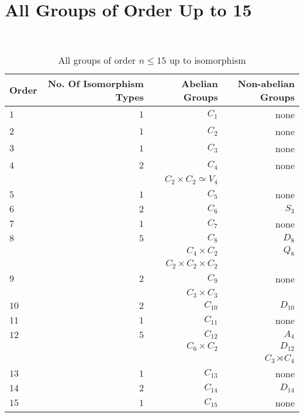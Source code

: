 \section{All Groups of Order Up to 15}

\begin{center}
  \begin{table}[H]~\label{tbl:all-groups}
    \begin{tabular}{ l | r | r | r }
      Order & No. Of Isomorphism Types & Abelian Groups & Non-abelian Groups \\
      \midrule
      $1$ & $1$ & $C_1$ & none \\
      \midrule
      $2$ & $1$ & $C_2$ & none \\
      \midrule
      $3$ & $1$ & $C_3$ & none \\
      \midrule
      $4$ & $2$ & $C_4$ & none \\
          &     & $C_2 \times C_2 \simeq V_4$ & \\
      \midrule
      $5$ & $1$ & $C_5$ & none \\
      \midrule
      $6$ & $2$ & $C_6$ & $S_3$ \\
      \midrule
      $7$ & $1$ & $C_7$ & none \\
      \midrule
      $8$ & $5$ & $C_8$ & $D_8$ \\
          &     & $C_4 \times C_2$ & $Q_8$ \\
          &     & $C_2 \times C_2 \times C_2$ &    \\
      \midrule
      $9$ & $2$ & $C_9$ & none \\
          &     & $C_3 \times C_3$ & \\
      \midrule
      $10$ & $2$ & $C_{10}$ & $D_{10}$ \\
      \midrule
      $11$ & $1$ & $C_{11}$ & none \\
      \midrule
      $12$ & $5$ & $C_{12}$ & $A_4$ \\
          &     & $C_6 \times C_2$ & $D_{12}$ \\
          &     &   & $C_3 \rtimes C_4$ \\
      \midrule
      $13$ & $1$ & $C_{13}$ & none \\
      \midrule
      $14$ & $2$ & $C_{14}$ & $D_{14}$ \\
      \midrule
      $15$ & $1$ & $C_{15}$ & none \\
      \bottomrule
    \end{tabular}
  \caption{All groups of order $n \le 15$ up to isomorphism}~\label{tab:groups-n-15}
  \end{table}
\end{center}
